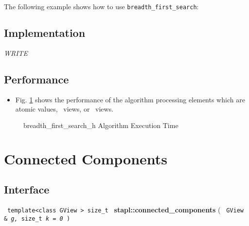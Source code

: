 The following example shows how to use 
\texttt{breadth\_first\_search}:
 

\subsection{Implementation} \label{sec-br-first-hmach-hubs-alg-impl}

\textit{WRITE}

\subsection{Performance} \label{sec-br-first-hmach-hubs-alg-perf}

\begin{itemize}
\item
Fig. \ref{fig:br-first-hmach-hubs-alg-exec-exper}
shows the performance of the algorithm processing
elements which are atomic values, \stl\ views, or \stapl\ views.
\end{itemize}

\begin{figure}[p]
\caption{breadth\_first\_search\_h Algorithm Execution Time}
\label{fig:br-first-hmach-hubs-alg-exec-exper}
\end{figure}


\section{ Connected Components}
\label{sec-conn-comp-alg}

\subsection{Interface} \label{sec-conn-comp-alg-inter}

\noindent
\texttt{%
template<class GView >
\newline
size\_t 
}
\newline
\textbf{stapl::connected\_components}%
\newline
(
\texttt{%
GView \&
\textit{g,}%
size\_t
\textit{k = 0}%
)     
}
\vspace{0.4cm}

